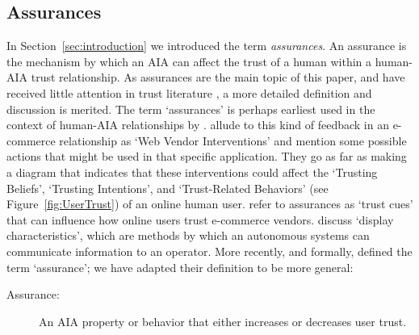 \subsection{Assurances} \label{sec:assurances}
    In Section~\ref{sec:introduction} we introduced the term \emph{assurances}. An assurance is the mechanism by which an AIA can affect the trust of a human within a human-AIA trust relationship. As assurances are the main topic of this paper, and have received little attention in trust literature , a more detailed definition and discussion is merited. The term `assurances' is perhaps earliest used in the context of human-AIA relationships by \citet{Sheridan1984-kx}. \citet{McKnight2001-fa} allude to this kind of feedback in an e-commerce relationship as `Web Vendor Interventions' and mention some possible actions that might be used in that specific application. They go as far as making a diagram that indicates that these interventions could affect the `Trusting Beliefs', `Trusting Intentions', and `Trust-Related Behaviors' (see Figure~\ref{fig:UserTrust}) of an online human user. \citet{Corritore2003-gx} refer to assurances as `trust cues' that can influence how online users trust e-commerce vendors. \citet{Lee2004-pv} discuss `display characteristics', which are methods by which an autonomous systems can communicate information to an operator. More recently, and formally, \citet{Lillard2016-yg} defined the term `assurance'; we have adapted their definition to be more general:    
    \begin{description}
        \item [Assurance:] An AIA property or behavior that either increases or decreases user trust.
    \end{description}


